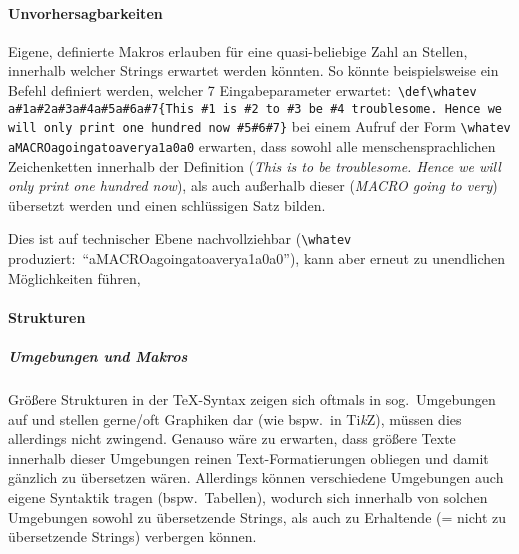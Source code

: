 \paragraph*{Unvorhersagbarkeiten}%
Eigene, definierte Makros erlauben für eine quasi-beliebige Zahl an Stellen, innerhalb welcher Strings erwartet werden könnten. So könnte beispielsweise ein Befehl definiert werden, welcher 7 Eingabeparameter erwartet:\ \verb|\def\whatev a#1a#2a#3a#4a#5a#6a#7{This #1 is #2 to #3 be #4 troublesome. Hence we will only print one hundred now #5#6#7}| bei einem Aufruf der Form \verb|\whatev aMACROagoingatoaverya1a0a0| erwarten, dass sowohl alle menschensprachlichen Zeichenketten innerhalb der Definition (\textit{This is to be troublesome. Hence we will only print one hundred now}), als auch außerhalb dieser (\textit{MACRO going to very}) übersetzt werden und einen schlüssigen Satz bilden. 
\def\whatev a#1a#2a#3a#4a#5a#6a#7{This #1 is #2 to #3 be #4 troublesome. Hence we will only print one hundred now #5#6#7}

Dies ist auf technischer Ebene nachvollziehbar (\verb|\whatev| produziert:\ \enquote{\whatev aMACROagoingatoaverya1a0a0}), kann aber erneut zu unendlichen Möglichkeiten führen, 

\paragraph*{Strukturen}
\subparagraph*{Umgebungen und Makros}
Größere Strukturen in der \TeX{}-Syntax zeigen sich oftmals in sog.\ Umgebungen auf und stellen gerne/oft Graphiken dar (wie bspw.\ in Ti\textit{k}Z), müssen dies allerdings nicht zwingend. Genauso wäre zu erwarten, dass größere Texte innerhalb dieser Umgebungen reinen Text-Formatierungen obliegen und damit gänzlich zu übersetzen wären. Allerdings können verschiedene Umgebungen auch eigene Syntaktik tragen (bspw.\ Tabellen), wodurch sich innerhalb von solchen Umgebungen sowohl zu übersetzende Strings, als auch zu Erhaltende (= nicht zu übersetzende Strings) verbergen können. 

